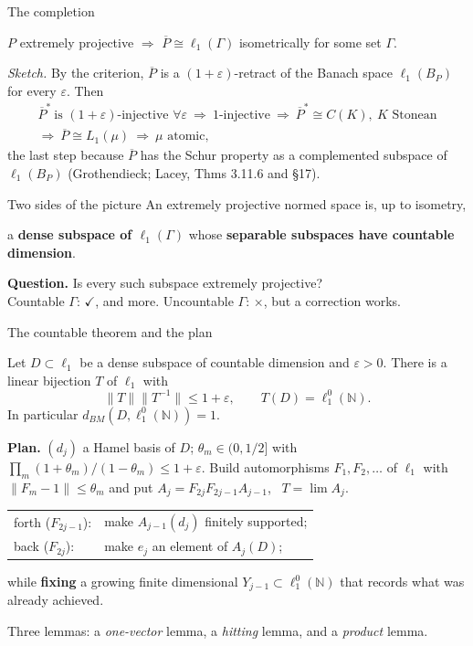 \documentclass[10pt,aspectratio=169]{beamer}
\newcommand{\lo}[1]{\ell_1^0(#1)}
\newcommand{\ellone}[1]{\ell_1(#1)}
\newcommand{\BM}{d_{BM}}
\newcommand{\NN}{\mathbb N}
\newcommand{\yes}{\textcolor{good}{$\checkmark$}}
\newcommand{\no}{\textcolor{accent}{$\boldsymbol\times$}}
\begin{document}
\begin{frame}{The completion}
  \begin{theorem}[Helemskii 2013; Gr{\o}nb{\ae}k 2016]
    $P$ extremely projective $\Rightarrow$ $\overline P\cong\ellone\Gamma$
    isometrically for some set $\Gamma$.
  \end{theorem}
  \textit{Sketch.} By the criterion, $\overline P$ is a $(1+\varepsilon)$-retract
  of the Banach space $\ellone{B_P}$ for every $\varepsilon$. Then
  \begin{gather*}
    {\overline P}^*\ \text{is $(1+\varepsilon)$-injective }\forall\varepsilon
    \ \Rightarrow\ \text{$1$-injective}
    \ \Rightarrow\ {\overline P}^*\cong C(K),\ K\text{ Stonean}\\
    \Rightarrow\ \overline P\cong L_1(\mu)
    \ \Rightarrow\ \mu\text{ atomic},
  \end{gather*}
  the last step because $\overline P$ has the Schur property as a complemented
  subspace of $\ellone{B_P}$ (Grothendieck; Lacey, Thms 3.11.6 and \S17).

  \begin{block}{Two sides of the picture}
    An extremely projective normed space is, up to isometry,
    \begin{center}
      a \textbf{dense subspace of $\ellone\Gamma$}
      \quad whose \quad
      \textbf{separable subspaces have countable dimension}.
    \end{center}
  \end{block}
  \textbf{Question.} Is every such subspace extremely projective? \\
  Countable $\Gamma$: \yes, and more. \quad Uncountable $\Gamma$: \no, but
  a correction works.
\end{frame}

\begin{frame}{The countable theorem and the plan}
  \begin{theorem}
    Let $D\subset\ell_1$ be a dense subspace of countable dimension and
    $\varepsilon>0$. There is a linear bijection $T$ of $\ell_1$ with
    \[
      \|T\|\|T^{-1}\|\le1+\varepsilon,\qquad T(D)=\lo\NN .
    \]
    In particular $\BM(D,\lo\NN)=1$.
  \end{theorem}
  \textbf{Plan.} $(d_j)$ a Hamel basis of $D$; $\theta_m\in(0,1/2]$ with
  $\prod_m(1+\theta_m)/(1-\theta_m)\le1+\varepsilon$. Build automorphisms
  $F_1,F_2,\dots$ of $\ell_1$ with $\|F_m-1\|\le\theta_m$ and put
  $A_j=F_{2j}F_{2j-1}A_{j-1}$, \ $T=\lim A_j$.
  \medskip

  \begin{tabular}{@{}ll@{}}
    \textcolor{accent}{forth} ($F_{2j-1}$): & make $A_{j-1}(d_j)$ finitely supported;\\[2pt]
    \textcolor{good}{back} ($F_{2j}$): & make $e_j$ an element of $A_j(D)$;
  \end{tabular}
  \medskip

  while \textbf{fixing} a growing finite dimensional $Y_{j-1}\subset\lo\NN$
  that records what was already achieved.
  \medskip

  Three lemmas: a \emph{one-vector} lemma, a \emph{hitting} lemma, and a
  \emph{product} lemma.
\end{frame}
\end{document}
